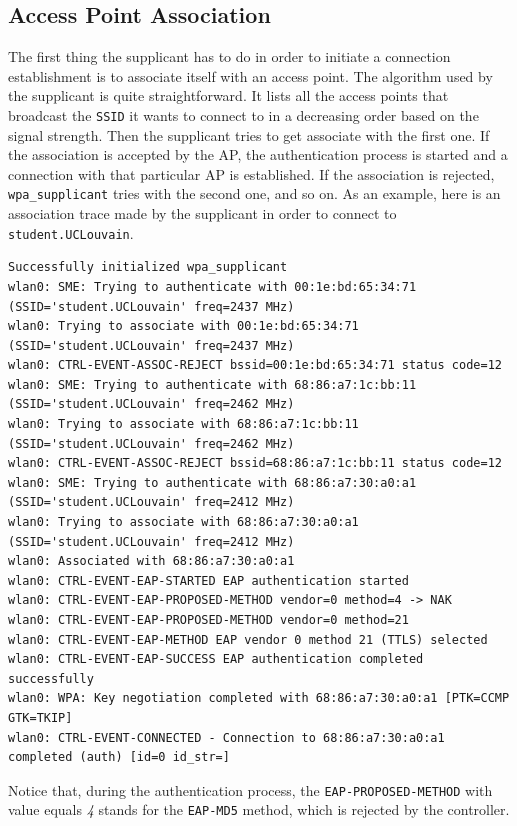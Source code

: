 \subsection{Access Point Association}
The first thing the supplicant has to do in order to initiate a connection establishment is to associate itself with an access point. The algorithm used by the supplicant is quite straightforward. It lists all the access points that broadcast the \texttt{SSID} it wants to connect to in a decreasing order based on the signal strength. Then the supplicant tries to get associate with the first one. If the association is accepted by the AP, the authentication process is started and a connection with that particular AP is established. If the association is rejected, \texttt{wpa\_supplicant} tries with the second one, and so on. As an example, here is an association trace made by the supplicant in order to connect to \texttt{student.UCLouvain}.\\

\begin{lstlisting}[frame=single,breaklines=true,caption={Association trace for \texttt{student.UCLouvain}}]
Successfully initialized wpa_supplicant
wlan0: SME: Trying to authenticate with 00:1e:bd:65:34:71 (SSID='student.UCLouvain' freq=2437 MHz)
wlan0: Trying to associate with 00:1e:bd:65:34:71 (SSID='student.UCLouvain' freq=2437 MHz)
wlan0: CTRL-EVENT-ASSOC-REJECT bssid=00:1e:bd:65:34:71 status code=12
wlan0: SME: Trying to authenticate with 68:86:a7:1c:bb:11 (SSID='student.UCLouvain' freq=2462 MHz)
wlan0: Trying to associate with 68:86:a7:1c:bb:11 (SSID='student.UCLouvain' freq=2462 MHz)
wlan0: CTRL-EVENT-ASSOC-REJECT bssid=68:86:a7:1c:bb:11 status code=12
wlan0: SME: Trying to authenticate with 68:86:a7:30:a0:a1 (SSID='student.UCLouvain' freq=2412 MHz)
wlan0: Trying to associate with 68:86:a7:30:a0:a1 (SSID='student.UCLouvain' freq=2412 MHz)
wlan0: Associated with 68:86:a7:30:a0:a1
wlan0: CTRL-EVENT-EAP-STARTED EAP authentication started
wlan0: CTRL-EVENT-EAP-PROPOSED-METHOD vendor=0 method=4 -> NAK
wlan0: CTRL-EVENT-EAP-PROPOSED-METHOD vendor=0 method=21
wlan0: CTRL-EVENT-EAP-METHOD EAP vendor 0 method 21 (TTLS) selected
wlan0: CTRL-EVENT-EAP-SUCCESS EAP authentication completed successfully
wlan0: WPA: Key negotiation completed with 68:86:a7:30:a0:a1 [PTK=CCMP GTK=TKIP]
wlan0: CTRL-EVENT-CONNECTED - Connection to 68:86:a7:30:a0:a1 completed (auth) [id=0 id_str=]
\end{lstlisting}

Notice that, during the authentication process, the \texttt{EAP-PROPOSED-METHOD} with value equals \textit{4} stands for the \texttt{EAP-MD5} method, which is rejected by the controller.


